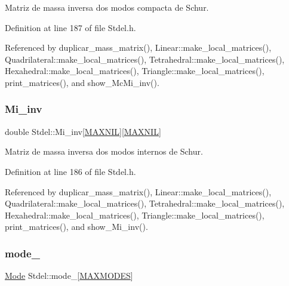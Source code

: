 Matriz de massa inversa dos modos compacta de Schur. 



Definition at line 187 of file Stdel.\+h.



Referenced by duplicar\+\_\+mass\+\_\+matrix(), Linear\+::make\+\_\+local\+\_\+matrices(), Quadrilateral\+::make\+\_\+local\+\_\+matrices(), Tetrahedral\+::make\+\_\+local\+\_\+matrices(), Hexahedral\+::make\+\_\+local\+\_\+matrices(), Triangle\+::make\+\_\+local\+\_\+matrices(), print\+\_\+matrices(), and show\+\_\+\+Mc\+Mi\+\_\+inv().

\mbox{\label{classStdel_a53a9490d5a02a96473d96848bac3711a}} 
\subsubsection{\texorpdfstring{Mi\+\_\+inv}{Mi\_inv}}
{\footnotesize\ttfamily double Stdel\+::\+Mi\+\_\+inv\mbox{[}\hyperlink{MyOptions_8h_a463cdf068fb6289d1f81dac7e0f76ab5}{M\+A\+X\+N\+IL}\mbox{]}\mbox{[}\hyperlink{MyOptions_8h_a463cdf068fb6289d1f81dac7e0f76ab5}{M\+A\+X\+N\+IL}\mbox{]}\hspace{0.3cm}{\ttfamily [protected]}}



Matriz de massa inversa dos modos internos de Schur. 



Definition at line 186 of file Stdel.\+h.



Referenced by duplicar\+\_\+mass\+\_\+matrix(), Linear\+::make\+\_\+local\+\_\+matrices(), Quadrilateral\+::make\+\_\+local\+\_\+matrices(), Tetrahedral\+::make\+\_\+local\+\_\+matrices(), Hexahedral\+::make\+\_\+local\+\_\+matrices(), Triangle\+::make\+\_\+local\+\_\+matrices(), print\+\_\+matrices(), and show\+\_\+\+Mi\+\_\+inv().

\mbox{\label{classStdel_a7a09cf048f14496813a914ca6afe7366}} 
\subsubsection{\texorpdfstring{mode\+\_\+}{mode\_}}
{\footnotesize\ttfamily \hyperlink{classMode}{Mode} Stdel\+::mode\+\_\+\mbox{[}\hyperlink{MyOptions_8h_aa75ccd382acf88cec3e9c8025c1f88b7}{M\+A\+X\+M\+O\+D\+ES}\mbox{]}\hspace{0.3cm}{\ttfamily [protected]}}



